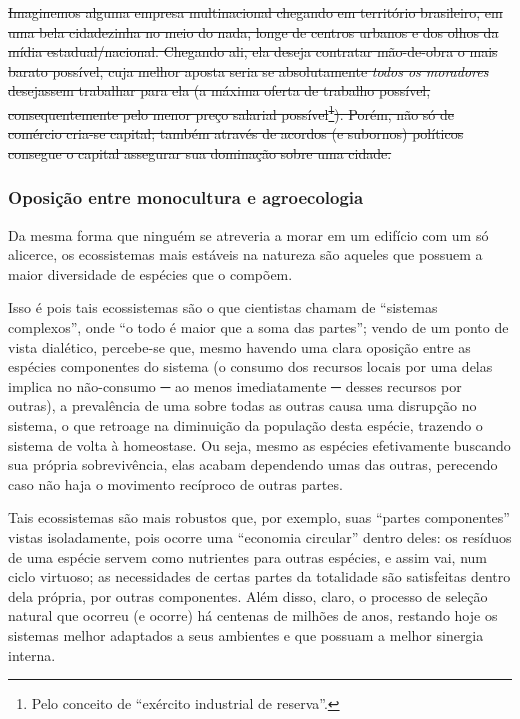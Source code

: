 \st{Imaginemos alguma empresa multinacional chegando em território
brasileiro, em uma bela cidadezinha no meio do nada, longe de centros
urbanos e dos olhos da mídia estadual/nacional. Chegando ali, ela deseja
contratar mão-de-obra o mais barato possível, cuja melhor aposta seria
se absolutamente \textit{todos os moradores} desejassem trabalhar para
ela (a máxima oferta de trabalho possível, consequentemente pelo menor
preço salarial possível\footnote{Pelo conceito de ``exército industrial
  de reserva''.}). Porém, não só de comércio cria-se capital; também
através de acordos (e subornos) políticos consegue o capital assegurar
sua dominação sobre uma cidade.}

\hypertarget{oposiuxe7uxe3o-entre-monocultura-e-agroecologia}{%
\subsubsection{Oposição entre monocultura e
agroecologia}\label{oposiuxe7uxe3o-entre-monocultura-e-agroecologia}}

Da mesma forma que ninguém se atreveria a morar em um edifício com um só
alicerce, os ecossistemas mais estáveis na natureza são aqueles que
possuem a maior diversidade de espécies que o compõem.

Isso é pois tais ecossistemas são o que cientistas chamam de ``sistemas
complexos'', onde ``o todo é maior que a soma das partes''; vendo de um
ponto de vista dialético, percebe-se que, mesmo havendo uma clara
oposição entre as espécies componentes do sistema (o consumo dos
recursos locais por uma delas implica no não-consumo ─ ao menos
imediatamente ─ desses recursos por outras), a prevalência de uma sobre
todas as outras causa uma disrupção no sistema, o que retroage na
diminuição da população desta espécie, trazendo o sistema de volta à
homeostase. Ou seja, mesmo as espécies efetivamente buscando sua própria
sobrevivência, elas acabam dependendo umas das outras, perecendo caso
não haja o movimento recíproco de outras partes.

Tais ecossistemas são mais robustos que, por exemplo, suas ``partes
componentes'' vistas isoladamente, pois ocorre uma ``economia circular''
dentro deles: os resíduos de uma espécie servem como nutrientes para
outras espécies, e assim vai, num ciclo virtuoso; as necessidades de
certas partes da totalidade são satisfeitas dentro dela própria, por
outras componentes. Além disso, claro, o processo de seleção natural que
ocorreu (e ocorre) há centenas de milhões de anos, restando hoje os
sistemas melhor adaptados a seus ambientes e que possuam a melhor
sinergia interna.


